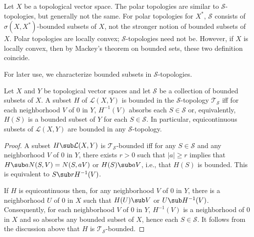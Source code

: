 \begin{example}
Let $X$ be a topological vector space. The polar topologies are similar to $\mathcal{S}$-topologies, but generally not the same. For polar topologies for $X^*$, $\mathcal{S}$ consists of $\sigma(X,X^*)$-bounded subsets of $X$, not the stronger notion of bounded subsets of $X$. Polar topologies are locally convex; $\mathcal{S}$-topologies need not be. However, if $X$ is locally convex, then by Mackey's theorem on bounded sets, these two definition coincide.
\end{example}
For later use, we characterize bounded subsets in $\mathcal{S}$-topologies.
\begin{proposition}\label{S-topo on L(X,Y) bounded iff}
Let $X$ and $Y$ be topological vector spaces and let $\mathcal{S}$ be a collection of bounded subsets of $X$. A subset $H$ of $\mathcal{L}(X,Y)$ is bounded in the $\mathcal{S}$-topology $\mathcal{T}_\mathcal{S}$ iff for each neighborhood $V$ of $0$ in $Y$, $H^{-1}(V)$ absorbs each $S\in\mathcal{S}$ or, equivalently, $H(S)$ is a bounded subset of $Y$ for each $S\in\mathcal{S}$. In particular, equicontinuous subsets of $\mathcal{L}(X,Y)$ are bounded in any $\mathcal{S}$-topology.
\end{proposition}
\begin{proof}
A subset $H\sub\mathcal{L}(X,Y)$ is $\mathcal{T}_\mathcal{S}$-bounded iff for any $S\in\mathcal{S}$ and any neighborhood $V$ of $0$ in $Y$, there exists $r>0$ such that $|a|\geq r$ implies that $H\sub aN(S,V)=N(S,aV)$ or $H(S)\sub aV$, i.e., that $H(S)$ is bounded. This is equivalent to $S\sub rH^{-1}(V)$.\par
If $H$ is equicontinuous then, for any neighborhood $V$ of $0$ in $Y$, there is a neighborhood $U$ of $0$ in $X$ such that $H(U)\sub V$ or $U\sub H^{-1}(V)$. Consequently, for each neighborhood $V$ of $0$ in $Y$, $H^{-1}(V)$ is a neighborhood of $0$ in $X$ and so absorbs any bounded subset of $X$, hence each $S\in\mathcal{S}$. It follows from the discussion above that $H$ is $\mathcal{T}_\mathcal{S}$-bounded.
\end{proof}

